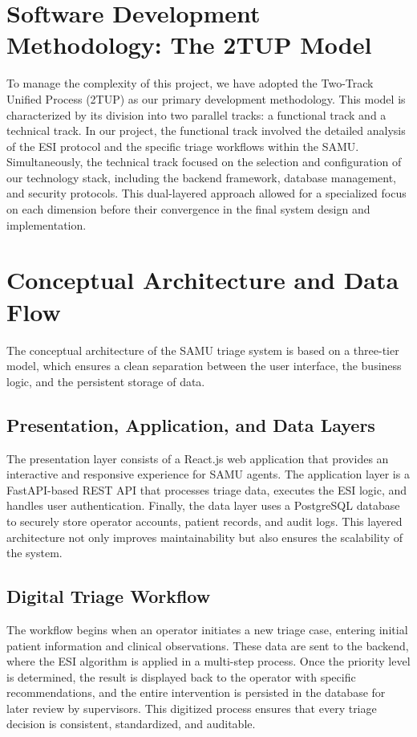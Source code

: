 \section{Software Development Methodology: The 2TUP Model}
To manage the complexity of this project, we have adopted the Two-Track Unified Process (2TUP) as our primary development methodology. This model is characterized by its division into two parallel tracks: a functional track and a technical track. In our project, the functional track involved the detailed analysis of the ESI protocol and the specific triage workflows within the SAMU. Simultaneously, the technical track focused on the selection and configuration of our technology stack, including the backend framework, database management, and security protocols. This dual-layered approach allowed for a specialized focus on each dimension before their convergence in the final system design and implementation.

\section{Conceptual Architecture and Data Flow}
The conceptual architecture of the SAMU triage system is based on a three-tier model, which ensures a clean separation between the user interface, the business logic, and the persistent storage of data.

\subsection{Presentation, Application, and Data Layers}
The presentation layer consists of a React.js web application that provides an interactive and responsive experience for SAMU agents. The application layer is a FastAPI-based REST API that processes triage data, executes the ESI logic, and handles user authentication. Finally, the data layer uses a PostgreSQL database to securely store operator accounts, patient records, and audit logs. This layered architecture not only improves maintainability but also ensures the scalability of the system.

\subsection{Digital Triage Workflow}
The workflow begins when an operator initiates a new triage case, entering initial patient information and clinical observations. These data are sent to the backend, where the ESI algorithm is applied in a multi-step process. Once the priority level is determined, the result is displayed back to the operator with specific recommendations, and the entire intervention is persisted in the database for later review by supervisors. This digitized process ensures that every triage decision is consistent, standardized, and auditable.

\clearpage
